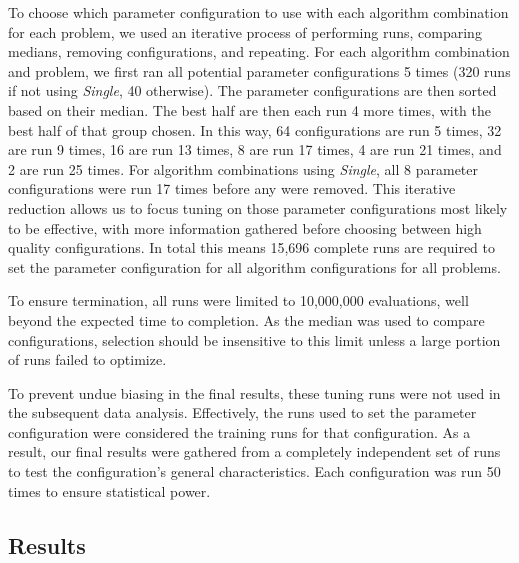 \documentclass[journal]{IEEEtran}
\begin{document}
To choose which parameter configuration to use with each algorithm combination
for each problem, we used an iterative process of performing runs, comparing medians, removing configurations,
and repeating.  For each algorithm combination and problem, we first ran all
potential parameter configurations 5 times (320 runs if not using \emph{Single}, 40 otherwise).
The parameter configurations are then sorted based on their median.  The best half are then
each run 4 more times, with the best half of that group chosen.  In this way, 64 configurations
are run 5 times, 32 are run 9 times, 16 are run 13 times, 8 are run 17 times, 4 are run 21 times,
and 2 are run 25 times.  For algorithm combinations using \emph{Single}, all 8 parameter configurations were run 17 times
before any were removed.  This iterative reduction allows us to focus tuning on
those parameter configurations most likely to be effective, with more information
gathered before choosing between high quality configurations.  In total this means
15,696 complete runs are required to set the parameter configuration for all
algorithm configurations for all problems.

To ensure termination, all runs were limited to 10,000,000 evaluations, well beyond
the expected time to completion.  As the median was used to compare configurations,
selection should be insensitive to this limit unless a large
portion of runs failed to optimize.

To prevent undue biasing in the final results, these tuning runs were
not used in the subsequent data analysis.  Effectively, the runs used to set
the parameter configuration were considered
the training runs for that configuration.  As a result, our final results were gathered
from a completely independent set of runs to test the configuration's general characteristics.
Each configuration was run 50 times to ensure statistical power.

\subsection{Results}
\end{document}
